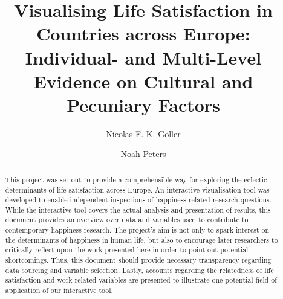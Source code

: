 \documentclass[preprint,12pt,authoryear]{elsarticle}
\begin{document}
	
	\begin{frontmatter}
		
		
		
		\title{Visualising Life Satisfaction in Countries across Europe: Individual- and Multi-Level Evidence on Cultural and Pecuniary Factors}
		
		\author{Nicolas F. K. Göller}
		
		\author{Noah Peters}
		
		\address{Zeppelin University, Fallenbrunnen 3, 88045 Friedrichshafen}
		
		
		\begin{abstract}
			This project was set out to provide a comprehensible way for exploring the eclectic determinants of life satisfaction 
			across Europe. An interactive visualisation tool was developed to enable independent inspections of happiness-related
			research questions. While the interactive tool covers the actual analysis and presentation of results, this document
			provides an overview over data and variables used to contribute to contemporary happiness research. 
			The project's aim is not only to spark interest on the determinants of happiness in human life, but also to encourage
			later researchers to critically reflect upon the work presented here in order to point out potential shortcomings. 
			Thus, this document should provide necessary transparency regarding data sourcing and variable selection.
			Lastly, accounts regarding the relatedness of life satisfaction and work-related variables are presented to illustrate one potential
			field of application of our interactive tool. 
		\end{abstract}
		
	\end{frontmatter}
	
\end{document}
